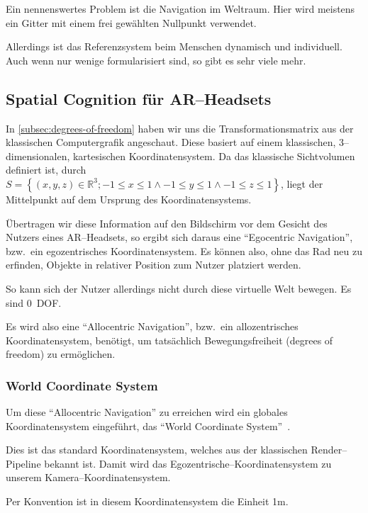         Ein nennenswertes Problem ist die Navigation im Weltraum.
        Hier wird meistens ein Gitter mit einem frei gewählten Nullpunkt verwendet.

        Allerdings ist das Referenzsystem beim Menschen dynamisch und individuell.
        Auch wenn nur wenige formularisiert sind, so gibt es sehr viele mehr.

\subsection{Spatial Cognition für AR--Headsets}\label{subsec:spatial-cognition-fuer-ar-headsets}
    In \autoref{subsec:degrees-of-freedom} haben wir uns die Transformationsmatrix aus der klassischen Computergrafik angeschaut.
    Diese basiert auf einem klassischen, 3--dimensionalen, kartesischen Koordinatensystem.
    Da das klassische Sichtvolumen definiert ist, durch $S=\left\{(x,y,z)\in \mathbb{R}^3;-1\leq x\leq 1\land -1\leq y\leq 1\land -1\leq z\leq 1\right\}$, liegt der Mittelpunkt auf dem Ursprung des Koordinatensystems.

    Übertragen wir diese Information auf den Bildschirm vor dem Gesicht des Nutzers eines AR--Headsets, so ergibt sich daraus eine \enquote{Egocentric Navigation}, bzw.\ ein egozentrisches Koordinatensystem.
    Es können also, ohne das Rad neu zu erfinden, Objekte in relativer Position zum Nutzer platziert werden.

    So kann sich der Nutzer allerdings nicht durch diese virtuelle Welt bewegen.
    Es sind 0~DOF\@.

    Es wird also eine \enquote{Allocentric Navigation}, bzw.\ ein allozentrisches Koordinatensystem, benötigt, um tatsächlich Bewegungsfreiheit (degrees of freedom) zu ermöglichen.

    \subsubsection{World Coordinate System}\label{subsubsec:world-coordinate-system}
        Um diese \enquote{Allocentric Navigation} zu erreichen wird ein globales Koordinatensystem eingeführt, das \enquote{World Coordinate System}~\autocite{sean-kerawala-2022}.

        Dies ist das standard Koordinatensystem, welches aus der klassischen Render--Pipeline bekannt ist.
        Damit wird das Egozentrische--Koordinatensystem zu unserem Kamera--Koordinatensystem.

        Per Konvention ist in diesem Koordinatensystem die Einheit 1m.

